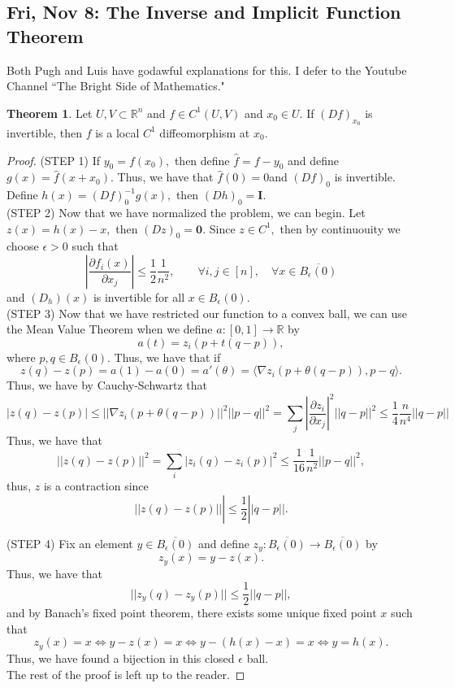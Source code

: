 \documentclass[10pt, oneside]{article}
\newcommand{\bbR}{\mathbb{R}}
\theoremstyle{definition}
\newtheorem{thm}{Theorem}
\begin{document}
\subsection{Fri, Nov 8: The Inverse and Implicit Function Theorem} Both Pugh and Luis have godawful explanations for this. I defer to the Youtube Channel ``The Bright Side of Mathematics."
\begin{thm}
    Let $U, V \subset \bbR^n$ and $f\in C^1(U,V)$ and $x_0 \in U.$ If $(Df)_{x_0}$ is invertible, then $f$ is a local $C^1$ diffeomorphism at $x_0.$
\end{thm}
\begin{proof}
    (STEP 1) If $y_0 = f(x_0),$ then define $\hat{f} = f - y_0$ and define $g(x) = \hat{f}(x + x_0).$ Thus, we have that $\hat{f}(0) = 0$and $(Df)_0$ is invertible. Define $h(x) = (Df)_0^{-1}g(x),$ then $(Dh)_0 = \textbf{I}.$\\

    (STEP 2) Now that we have normalized the problem, we can begin. Let $z(x) = h(x) - x,$ then $(Dz)_0 = \textbf{0}.$ Since $z\in C^1,$  then by continuouity we choose $\epsilon>0$ such that 
    \[\left|\frac{\partial f_i(x)}{\partial x_j}\right|\leq \frac{1}{2}\frac{1}{n^2}, \qquad \forall i, j \in [n], \quad \forall x\in \overline{B_\epsilon(0)}\] and $(D_h)(x)$ is invertible for all $x \in B_\epsilon(0).$\\

    (STEP 3) Now that we have restricted our function to a convex ball, we can use the Mean Value Theorem when we define $a: [0,1]\to \bbR$ by 
    \[a(t) = z_i(p + t(q-p)),\] where $p,q \in B_\epsilon(0).$ Thus, we have that if 
    \[z(q) - z(p) = a(1) - a(0) = a'(\theta) = \langle\nabla z_i(p + \theta(q-p)), p-q\rangle.\] Thus, we have by Cauchy-Schwartz that 
    \[|z(q) - z(p)| \leq ||\nabla z_i(p + \theta(q-p))||^2||p-q||^2 =  \sum_{j}\left|\frac{\partial z_i}{\partial x_j}\right|^2 ||q-p||^2\leq \frac{1}{4}\frac{n}{n^4}||q-p||\] Thus, we have that 
    \[||z(q) - z(p)||^2  = \sum_{i}|z_i(q) - z_i(p)|^2 \leq \frac{1}{16}\frac{1}{n^2}||p-q||^2,\] thus, $z$ is a contraction since
    \[||z(q) - z(p)||| \leq \frac{1}{2}||q-p||.\]

    (STEP 4) Fix an element $y \in \overline{B_\epsilon(0)}$ and define $z_y: \overline{B_\epsilon(0)} \to \overline{B_\epsilon(0)}$ by 
    \[z_y(x) = y - z(x).\] Thus, we have that 
    \[||z_y(q) - z_y(p)||\leq \frac{1}{2}||q-p||,\] and by Banach's fixed point theorem, there exists some unique fixed point $x$ such that 
    \[z_y(x) = x \iff y- z(x) = x \iff y - (h(x) - x) = x \iff y = h(x).\] Thus, we have found a bijection in this closed $\epsilon$ ball.\\

    The rest of the proof is left up to the reader.
\end{proof} 
\end{document}
